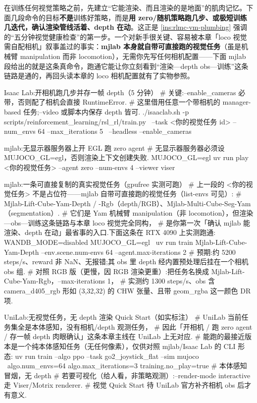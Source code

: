 在训练任何视觉策略之前，先建立“它能渲染、而且渲染的是地面”的肌肉记忆。下面几段命令的目标\textbf{不是}训练好策略，而是\textbf{用 zero/随机策略跑几步、或极短训练几迭代，确认渲染管线活着、depth 在动}。这正是 \cref{ins:rlmc-vm-plumbing} 强调的“五分钟视觉健康检查”的第一步。一个对新手很关键、容易被本章「loco 视觉需自配相机」叙事盖过的事实：\textbf{mjlab 本身就自带可直接跑的视觉任务}（虽是机械臂 manipulation 而非 locomotion），无需你先写任何相机配置——下面 mjlab 段给出的就是这条真命令，跑通它能让你立刻看到“渲染—depth obs—训练”这条链路是通的，再回头读本章的 loco 相机配置就有了实物参照。

\begin{codebox}[bash]{Isaac Lab:开相机跑几步并存一帧 depth（5 分钟）}
# 关键:--enable_cameras 必带，否则配了相机会直接 RuntimeError.
# 这里借用任意一个带相机的 manager-based 任务;--video 或脚本内保存 depth 皆可.
./isaaclab.sh -p scripts/reinforcement_learning/rsl_rl/train.py \
  --task <你的视觉任务 id> --num_envs 64 --max_iterations 5 \
  --headless --enable_cameras
\end{codebox}

\begin{codebox}[bash]{mjlab:无显示器服务器上开 EGL 跑 zero agent}
# 无显示器服务器必须设 MUJOCO_GL=egl，否则渲染上下文创建失败.
MUJOCO_GL=egl uv run play <你的视觉任务> --agent zero --num-envs 4 --viewer viser
\end{codebox}

\begin{codebox}[bash]{mjlab:一条可直接复制的真实视觉任务（gpufree 实测可跑）}
# 上一段的 <你的视觉任务> 不是占位符——mjlab 自带可直接跑的视觉任务（list-envs 可见）:
#   Mjlab-Lift-Cube-Yam-Depth / -Rgb（depth/RGB）、Mjlab-Multi-Cube-Seg-Yam（segmentation）.
# 它们是 Yam 机械臂 manipulation（非 locomotion），但渲染—obs—训练这条链路与本章 loco 视觉完全同构，
# 是你第一次「确认 mjlab 能渲染、depth 在动」最省事的入口.下面这条在 RTX 4090 上实测跑通:
WANDB_MODE=disabled MUJOCO_GL=egl \
  uv run train Mjlab-Lift-Cube-Yam-Depth --env.scene.num-envs 64 --agent.max-iterations 2
# 预期:约 5200 steps/s、reward 非 NaN、无报错;其 obs 里 depth 经内置预处理后挂在一个相机 obs 组.
# 对照 RGB 版（更慢，因 RGB 渲染更重）:把任务名换成 Mjlab-Lift-Cube-Yam-Rgb，--max-iterations 1，
#   实测约 1300 steps/s、obs 含 camera_d405_rgb 形如 (3,32,32) 的 CHW 张量、且带 geom_rgba 这一颜色 DR 项.
\end{codebox}

\begin{codebox}[bash]{UniLab:无视觉任务，无 depth 渲染 Quick Start（如实标注）}
# UniLab 当前任务集全是本体感知，没有相机/depth 观测任务，
# 因此「开相机 / 跑 zero agent / 存一帧 depth 肉眼确认」这条本章主线在 UniLab 上无对应.
# 能跑的最接近版本是一个纯本体感知任务（无任何像素），仅供对照 mjlab/Isaac Lab 的 CLI 形态:
uv run train --algo ppo --task go2_joystick_flat --sim mujoco \
    algo.num_envs=64 algo.max_iterations=3 training.no_play=true   # 本体感知冒烟，无 depth
# 若要可视化（给人看，非策略观测）:--render-mode interactive 走 Viser/Motrix renderer.
# 视觉 Quick Start 待 UniLab 官方补齐相机 obs 后才有意义.
\end{codebox}

